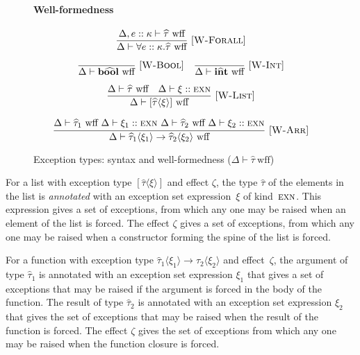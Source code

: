 \documentclass{llncs}
\newcommand{\HOR}{\quad}
\newcommand{\VER}{\\[1.5ex]}
\newcommand{\Rule}[3]{\frac{#2}{#3}\mbox{\ [\textsc{#1}]}}
\newcommand{\Throws}[2]{#1\langle #2\rangle}    %
\newcommand{\ExnTy}{\widehat\tau}
\newcommand{\ExnTyBool}{\mathrm{b\widehat{oo}l}}    %
\newcommand{\ExnTyList}[2]{\left[\Throws{#1}{#2}\right]\!}
\newcommand{\ExnTyArr}[4]{\Throws{#1}{#2} \to \Throws{#3}{#4}}
\newcommand{\ExnTyForall}[3]{\forall #1 :: #2. #3}
\newcommand{\Exn}{\xi}
\newcommand{\ExnAlt}{\zeta}
\newcommand{\ExnVar}{e}
\newcommand{\ExnBool}{\mathbf{b\widehat{oo}l}}      %
\newcommand{\ExnInt}{\mathbf{i\widehat{n}t}}        %
\newcommand{\Kind}{\kappa}                          %
\newcommand{\KindEXN}{\textsc{exn}}
\newcommand{\KiEnv}{\Delta}
\newcommand{\JudgeKind}[3]{{#1 \vdash #2 :: #3}}
\newcommand{\JudgeExnTyWff}[3]{{#2 \vdash #3\ \text{wff}}}
\begin{document}
\begin{figure}[h]
    \paragraph{Well-formedness}
    \begin{gather*}
        \Rule{W-Forall}
             {\JudgeExnTyWff{d}{\KiEnv,\ExnVar :: \Kind}{\ExnTy}}
             {\JudgeExnTyWff{d}{\KiEnv}{\ExnTyForall{\ExnVar}{\Kind}{\ExnTy}}}
        \VER
        \Rule{W-Bool}
             {}
             {\JudgeExnTyWff{d}{\KiEnv}{\ExnBool}}
        \HOR
        \Rule{W-Int}
             {}
             {\JudgeExnTyWff{d}{\KiEnv}{\ExnInt}}
        \VER
        \Rule{W-List}
             {\JudgeExnTyWff{d}{\KiEnv}{\ExnTy} \quad \JudgeKind{\KiEnv}{\Exn}{\KindEXN}}
             {\JudgeExnTyWff{d}{\KiEnv}{\ExnTyList{\ExnTy}{\Exn}}}
        \VER
        \Rule{W-Arr}
             {\begin{gathered}\JudgeExnTyWff{d}{\KiEnv}{\ExnTy_1} \  \JudgeKind{\KiEnv}{\Exn_1}{\KindEXN} \  \JudgeExnTyWff{d}{\KiEnv}{\ExnTy_2} \  \JudgeKind{\KiEnv}{\Exn_2}{\KindEXN}\end{gathered}}
             {\JudgeExnTyWff{d}{\KiEnv}{\ExnTyArr{\ExnTy_1}{\Exn_1}{\ExnTy_2}{\Exn_2}}}
    \end{gather*}
     \caption{Exception types: syntax and well-formedness ($\JudgeExnTyWff{d}{\KiEnv}{\ExnTy}$)}
    \label{fig-exception-type-combined}
\end{figure}


For a list with exception type $\ExnTyList{\ExnTy}{\Exn}$ and effect $\ExnAlt$, the type $\ExnTy$ of the elements in the list is \emph{annotated} with an exception set expression~$\Exn$ of kind~$\KindEXN$. This expression gives a set of exceptions, from which any one may be raised when an element of the list is forced. The effect $\ExnAlt$ gives a set of exceptions, from which any one may be raised when a constructor forming the spine of the list is forced.

For a function with exception type $\ExnTyArr{\ExnTy_1}{\Exn_1}{\ExnTy_2}{\Exn_2}$ and effect~$\ExnAlt$, the argument of type $\ExnTy_1$ is annotated with an exception set expression $\Exn_1$ that gives a set of exceptions that may be raised if the argument is forced in the body of the function. The result of type $\ExnTy_2$ is annotated with an exception set expression $\Exn_2$ that gives the set of exceptions that may be raised when the result of the function is forced. The effect $\ExnAlt$ gives the set of exceptions from which any one may be raised when the function closure is forced.
\end{document}
